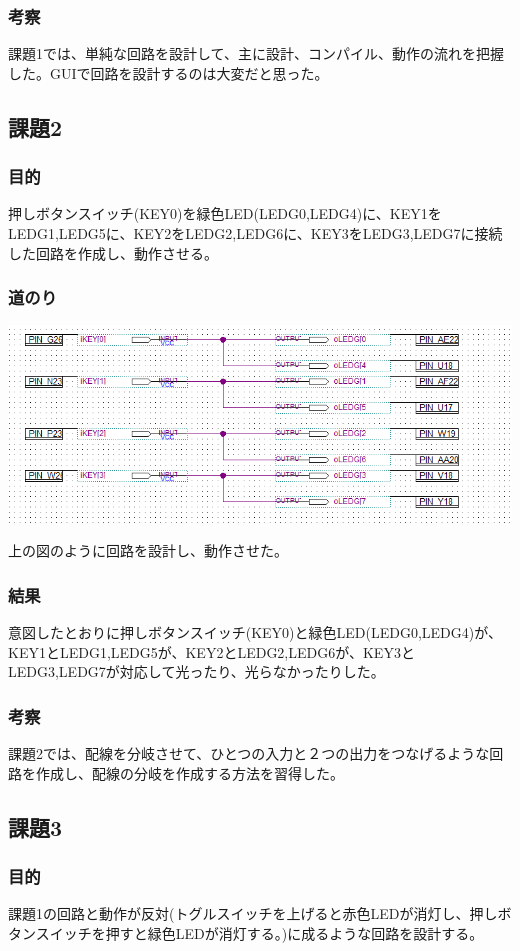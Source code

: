 \documentclass[a4paper]{jarticle}
\begin{document}
\subsubsection{考察}
課題1では、単純な回路を設計して、主に設計、コンパイル、動作の流れを把握した。GUIで回路を設計するのは大変だと思った。
\subsection{課題2}
\subsubsection{目的}
押しボタンスイッチ(KEY0)を緑色LED(LEDG0,LEDG4)に、KEY1をLEDG1,LEDG5に、KEY2をLEDG2,LEDG6に、KEY3をLEDG3,LEDG7に接続した回路を作成し、動作させる。
\subsubsection{道のり}
\begin{center}
	\includegraphics[width=15cm]{work2.PNG}
\end{center}
上の図のように回路を設計し、動作させた。
\subsubsection{結果}
意図したとおりに押しボタンスイッチ(KEY0)と緑色LED(LEDG0,LEDG4)が、KEY1とLEDG1,LEDG5が、KEY2とLEDG2,LEDG6が、KEY3とLEDG3,LEDG7が対応して光ったり、光らなかったりした。
\subsubsection{考察}
課題2では、配線を分岐させて、ひとつの入力と２つの出力をつなげるような回路を作成し、配線の分岐を作成する方法を習得した。
\subsection{課題3}
\subsubsection{目的}
課題1の回路と動作が反対(トグルスイッチを上げると赤色LEDが消灯し、押しボタンスイッチを押すと緑色LEDが消灯する。)に成るような回路を設計する。
\end{document}
